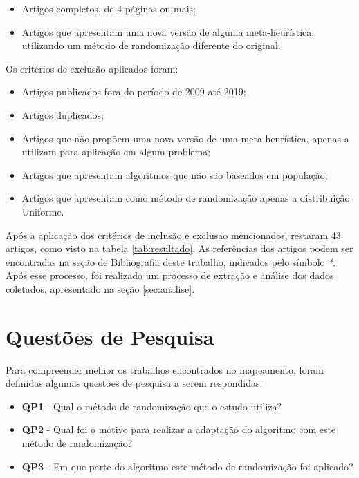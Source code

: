 \begin{itemize}
    \item Artigos completos, de 4 páginas ou mais;
    \item Artigos que apresentam uma nova versão de alguma meta-heurística, utilizando um método de randomização diferente do original.
\end{itemize}


Os critérios de exclusão aplicados foram:

\begin{itemize}
    \item Artigos publicados fora do período de 2009 até 2019;
    \item Artigos duplicados;
    \item Artigos que não propõem uma nova versão de uma meta-heurística, apenas a utilizam para aplicação em algum problema;
    \item Artigos que apresentam algoritmos que não são baseados em população;
    \item Artigos que apresentam como método de randomização apenas a distribuição Uniforme.
\end{itemize}

Após a aplicação dos critérios de inclusão e exclusão mencionados, restaram 43 artigos, como visto na tabela \ref{tab:resultado}. As referências dos artigos podem ser encontradas na seção de Bibliografia deste trabalho, indicados pelo símbolo \textit{*}. Após esse processo, foi realizado um processo de extração e análise dos dados coletados, apresentado na seção \ref{sec:analise}.

\section{Questões de Pesquisa}

Para compreender melhor os trabalhos encontrados no mapeamento, foram definidas algumas questões de pesquisa a serem respondidas:

\begin{itemize}
    \item \textbf{QP1} - Qual o método de randomização que o estudo utiliza? 
    \item \textbf{QP2} - Qual foi o motivo para realizar a adaptação do algoritmo com este método de randomização?
    \item \textbf{QP3} - Em que parte do algoritmo este método de randomização foi aplicado?
\end{itemize}

